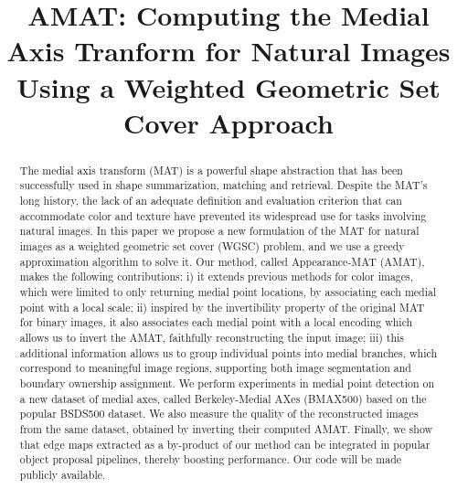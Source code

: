 \documentclass[10pt,twocolumn,letterpaper]{article}
\begin{document}
\title{AMAT: Computing the Medial Axis Tranform for Natural Images Using a Weighted Geometric Set Cover Approach}
\maketitle


\begin{abstract}
The medial axis transform (MAT) is a powerful shape abstraction that has been successfully
used in shape summarization, matching and retrieval. Despite the MAT's
long history, the lack of an adequate definition and evaluation criterion that can accommodate
color and texture have prevented its widespread use for tasks involving natural images.
In this paper we propose a new formulation of the
MAT for natural images as a weighted geometric set cover (WGSC) problem, and we use a greedy 
approximation algorithm to solve it.
Our method, called Appearance-MAT (AMAT), makes the following contributions: 
i) it extends previous methods for color images, which were limited to only returning medial point locations, 
by associating  each medial point with a local scale; 
ii) inspired by the invertibility property of the 
original MAT for binary images, it also associates each medial point with a local encoding
which allows us to invert the AMAT, faithfully reconstructing the input image; 
iii) this additional information allows us to group individual points into medial branches,
which correspond to meaningful image regions, supporting both image segmentation and boundary
ownership assignment.
We perform experiments in medial point detection on a new dataset of medial axes, called
Berkeley-Medial AXes (BMAX500) based on the popular BSDS500 dataset. 
We also measure the quality of the reconstructed images from the same dataset,
obtained by inverting their computed AMAT. 
Finally, we show that edge maps extracted as a by-product of our method
can be integrated in popular object proposal pipelines, thereby boosting performance.
Our code will be made publicly available. 

\end{abstract}

\end{document}
